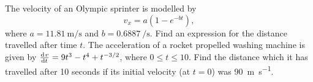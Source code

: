 \begin{questions}
  \questioM The velocity of an Olympic sprinter is modelled by
            \begin{displaymath}
              v_x = a(1 - e^{-bt}),
            \end{displaymath}
            where $ a = \SI{11.81}{\metre\per\second} $ and $ b = \SI{0.6887}{\per\second} $. Find an expression for the
            distance travelled after time $ t $.
  \questioM The acceleration of a rocket propelled washing machine is given by $ \od{v}{t} = 9t^3 - t^4 + t^{-3/2} $, where $ 0 \leq t \leq 10 $. Find
            the distance which it has travelled after 10 seconds if its initial velocity (at $ t = 0 $) was \SI{90}{\metre\per\second}.
\end{questions}


